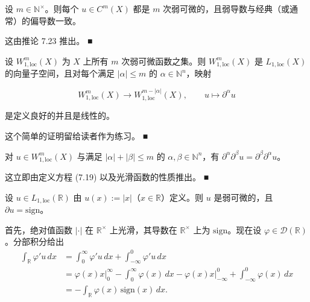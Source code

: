 \begin{remark}

\begin{items}
\item

设 $ m \in \mathbb{N}^{\times} $。则每个 $ u \in C^m(X) $ 都是 $ m $ 次弱可微的，且弱导数与经典（或通常）的偏导数一致。

\proofhead
这由推论 7.23 推出。 \nobreak\hspace{0.35em}■
\item

设 $ W_{1,\mathrm{loc}}^m(X) $ 为 $ X $ 上所有 $ m $ 次弱可微函数之集。则 $ W_{1,\mathrm{loc}}^m(X) $ 是 $ L_{1,\mathrm{loc}}(X) $ 的向量子空间，且对每个满足 $ |\alpha| \le m $ 的 $ \alpha \in \mathbb{N}^n $，映射

\[
W_{1,\mathrm{loc}}^m(X) \to W_{1,\mathrm{loc}}^{m-|\alpha|}(X) , \qquad u \mapsto \partial^{\alpha} u
\]

是定义良好的并且是线性的。

\proofhead
这个简单的证明留给读者作为练习。 \nobreak\hspace{0.35em}■
\item

对 $ u \in W_{1,\mathrm{loc}}^m(X) $ 与满足 $ |\alpha| + |\beta| \le m $ 的 $ \alpha, \beta \in \mathbb{N}^n $，有 $ \partial^{\alpha}\partial^{\beta} u = \partial^{\beta}\partial^{\alpha} u $。

\proofhead
这立即由定义方程 (7.19) 以及光滑函数的性质推出。 \nobreak\hspace{0.35em}■
\item

设 $ u \in L_{1,\mathrm{loc}}(\mathbb{R}) $ 由 $ u(x) := |x| $（$ x \in \mathbb{R} $）定义。则 $ u $ 是弱可微的，且 $ \partial u = \mathrm{sign} $。

\proofhead
首先，绝对值函数 $ |\cdot| $ 在 $ \mathbb{R}^{\times} $ 上光滑，其导数在 $ \mathbb{R}^{\times} $ 上为 $ \mathrm{sign} $。现在设 $ \varphi \in \mathcal{D}(\mathbb{R}) $。分部积分给出
\begin{equation*}
\begin{aligned}
\int_{\mathbb{R}} \varphi' u\, dx &= \int_0^{\infty} \varphi' u\, dx + \int_{-\infty}^0 \varphi' u\, dx \\ &= \varphi(x)x\Big|_0^{\infty} - \int_0^{\infty} \varphi(x)\, dx - \varphi(x)x\Big|_{-\infty}^0 + \int_{-\infty}^0 \varphi(x)\, dx \\ &= -\int_{\mathbb{R}} \varphi(x)\,\mathrm{sign}(x)\, dx .
\end{aligned}
\end{equation*}


\end{items}
\end{remark}
